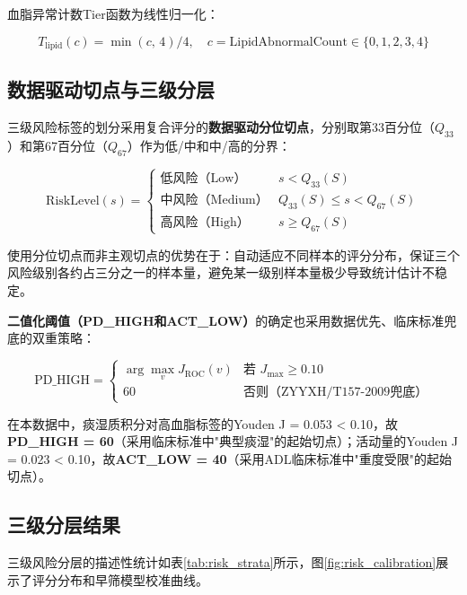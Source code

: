 \documentclass[12pt,a4paper]{ctexart}
\begin{document}
血脂异常计数Tier函数为线性归一化：

\begin{equation}
T_{\text{lipid}}(c) = \min(c,\, 4) / 4, \quad c = \text{LipidAbnormalCount} \in \{0, 1, 2, 3, 4\}
\label{eq:tier_lipid}
\end{equation}

\subsection{数据驱动切点与三级分层}

三级风险标签的划分采用复合评分的\textbf{数据驱动分位切点}，分别取第33百分位（$Q_{33}$）和第67百分位（$Q_{67}$）作为低/中和中/高的分界：

\begin{equation}
\text{RiskLevel}(s) = \begin{cases}
\text{低风险（Low）}   & s < Q_{33}(S) \\
\text{中风险（Medium）}& Q_{33}(S) \leq s < Q_{67}(S) \\
\text{高风险（High）}  & s \geq Q_{67}(S)
\end{cases}
\label{eq:risklevel}
\end{equation}

使用分位切点而非主观切点的优势在于：自动适应不同样本的评分分布，保证三个风险级别各约占三分之一的样本量，避免某一级别样本量极少导致统计估计不稳定。

\textbf{二值化阈值（PD\_HIGH和ACT\_LOW）}的确定也采用数据优先、临床标准兜底的双重策略：

\begin{equation}
\text{PD\_HIGH} = \begin{cases}
\arg\max_{v} J_{\text{ROC}}(v) & \text{若 } J_{\max} \geq 0.10 \\
60 & \text{否则（ZYYXH/T157-2009兜底）}
\end{cases}
\label{eq:pd_high}
\end{equation}

在本数据中，痰湿质积分对高血脂标签的Youden J = 0.053 < 0.10，故\textbf{PD\_HIGH = 60}（采用临床标准中"典型痰湿"的起始切点）；活动量的Youden J = 0.023 < 0.10，故\textbf{ACT\_LOW = 40}（采用ADL临床标准中"重度受限"的起始切点）。

\subsection{三级分层结果}

三级风险分层的描述性统计如表\ref{tab:risk_strata}所示，图\ref{fig:risk_calibration}展示了评分分布和早筛模型校准曲线。
\end{document}
